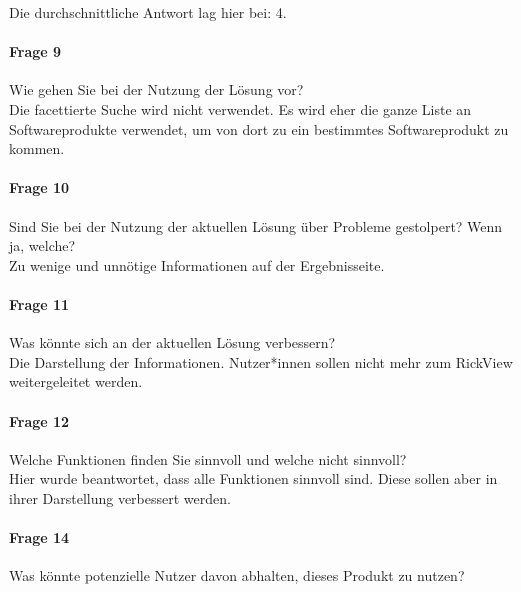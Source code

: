 \noindent Die durchschnittliche Antwort lag hier bei: 4. \\


\paragraph{Frage 9} Wie gehen Sie bei der Nutzung der Lösung vor? \\ 


\noindent  Die facettierte Suche wird nicht verwendet. Es wird eher die ganze Liste an Softwareprodukte verwendet, um von dort zu ein bestimmtes Softwareprodukt zu kommen.\\


\paragraph{Frage 10} Sind Sie bei der Nutzung der aktuellen Lösung über Probleme gestolpert? Wenn ja, welche? \\ 


\noindent  Zu wenige und unnötige Informationen auf der Ergebnisseite.\\


\paragraph{Frage 11} Was könnte sich an der aktuellen Lösung verbessern? \\ 


\noindent Die Darstellung der Informationen. Nutzer*innen sollen nicht mehr zum RickView weitergeleitet werden.  \\


\paragraph{Frage 12} Welche Funktionen finden Sie sinnvoll und welche nicht sinnvoll? \\ 


\noindent Hier wurde beantwortet, dass alle Funktionen sinnvoll sind. Diese sollen aber in ihrer Darstellung verbessert werden. \\


\paragraph{Frage 14} Was könnte potenzielle Nutzer davon abhalten, dieses Produkt zu nutzen? \\ 


